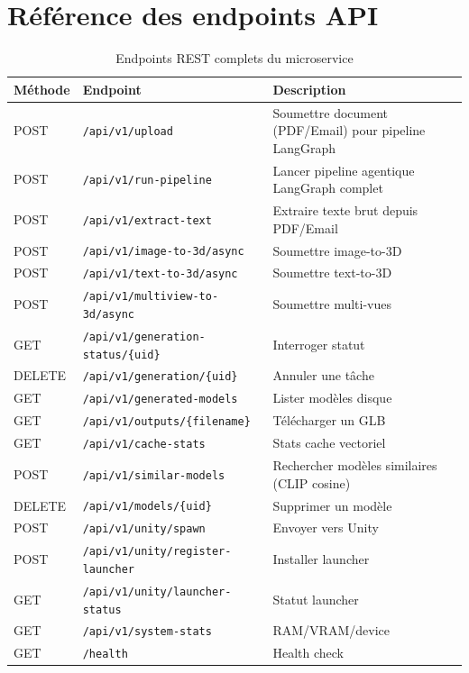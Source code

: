 \documentclass[12pt,a4paper,oneside]{report}
\newcommand{\theadrow}{\rowcolor{tekupblue!12}}
\begin{document}
\chapter{Référence des endpoints API}
\label{ann:api}
\begin{table}[H]
\centering
\caption{Endpoints REST complets du microservice}
\begin{tabularx}{\linewidth}{@{}llX@{}}
\toprule
\theadrow
\textbf{Méthode} & \textbf{Endpoint} & \textbf{Description} \\\midrule
POST   & \texttt{/api/v1/upload}                     & Soumettre document (PDF/Email) pour pipeline LangGraph \\
POST   & \texttt{/api/v1/run-pipeline}               & Lancer pipeline agentique LangGraph complet \\
POST   & \texttt{/api/v1/extract-text}               & Extraire texte brut depuis PDF/Email \\
POST   & \texttt{/api/v1/image-to-3d/async}          & Soumettre image-to-3D \\
POST   & \texttt{/api/v1/text-to-3d/async}          & Soumettre text-to-3D \\
POST   & \texttt{/api/v1/multiview-to-3d/async}     & Soumettre multi-vues \\
GET    & \texttt{/api/v1/generation-status/\{uid\}} & Interroger statut \\
DELETE & \texttt{/api/v1/generation/\{uid\}}        & Annuler une tâche \\
GET    & \texttt{/api/v1/generated-models}          & Lister modèles disque \\
GET    & \texttt{/api/v1/outputs/\{filename\}}      & Télécharger un GLB \\
GET    & \texttt{/api/v1/cache-stats}               & Stats cache vectoriel \\
POST   & \texttt{/api/v1/similar-models}             & Rechercher modèles similaires (CLIP cosine) \\
DELETE & \texttt{/api/v1/models/\{uid\}}            & Supprimer un modèle \\
POST   & \texttt{/api/v1/unity/spawn}               & Envoyer vers Unity \\
POST   & \texttt{/api/v1/unity/register-launcher}   & Installer launcher \\
GET    & \texttt{/api/v1/unity/launcher-status}     & Statut launcher \\
GET    & \texttt{/api/v1/system-stats}              & RAM/VRAM/device \\
GET    & \texttt{/health}                           & Health check \\
\bottomrule
\end{tabularx}
\end{table}
\end{document}
